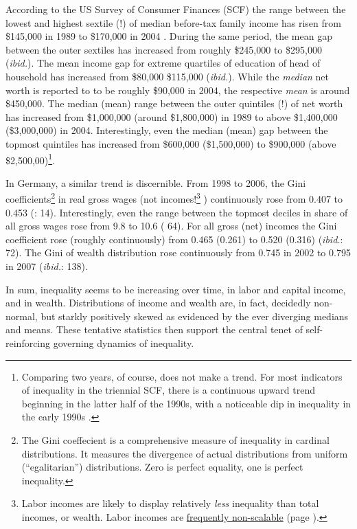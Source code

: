 According to the US Survey of Consumer Finances (SCF) the range between the lowest and highest sextile (!) of median before-tax family income has risen from \$145,000 in 1989 to \$170,000 in 2004 \citep{Bucks2006}. During the same period, the mean gap between the outer sextiles has increased from roughly \$245,000 to \$295,000 (\emph{ibid.}). The mean income gap for extreme quartiles of education of head of household has increased from \$80,000 \$115,000 (\emph{ibid.}). While the \emph{median} net worth is reported to to be roughly \$90,000 in 2004, the respective \emph{mean} is around \$450,000. The median (mean) range between the outer quintiles (!) of net worth has increased from \$1,000,000 (around \$1,800,000) in 1989 to above \$1,400,000 (\$3,000,000) in 2004. Interestingly, even the median (mean) gap between the topmost quintiles has increased from \$600,000 (\$1,500,000) to \$900,000 (above \$2,500,00)\footnote{Comparing two years, of course, does not make a trend. For most indicators of inequality in the triennial SCF, there is a continuous upward trend beginning in the latter half of the 1990s, with a noticeable dip in inequality in the early 1990s \citep{Bucks2006}.}.

In Germany, a similar trend is discernible. From 1998 to 2006, the Gini coefficients\footnote{
	The Gini coeffecient is a comprehensive measure of inequality in cardinal distributions. It measures the divergence of actual distributions from uniform (``egalitarian'') distributions. Zero is perfect equality, one is perfect inequality.}
in real gross wages (not incomes!\footnote{
	Labor incomes are likely to display relatively \emph{less} inequality than total incomes, or wealth. Labor incomes are \hyperref[sec:Extremistan]{frequently non-scalable} (page \pageref{sec:Extremistan}).}
) continuously rose from 0.407 to 0.453 (\citealt{Bundesregierung2006}: 14). Interestingly, even the range between the topmost deciles in share of all gross wages rose from 9.8 to 10.6 (\citealt{Grabka2007a} 64). For all gross (net) incomes the Gini coefficient rose (roughly continuously) from 0.465 (0.261) to 0.520 (0.316) (\emph{ibid.}: 72). The Gini of wealth distribution rose continuously from 0.745 in 2002 to 0.795 in 2007 (\emph{ibid.}: 138).

In sum, inequality seems to be increasing over time, in labor and capital income, and in wealth. Distributions of income and wealth are, in fact, decidedly non-normal, but starkly positively skewed as evidenced by the ever diverging medians and means. These tentative statistics then support the central tenet of self-reinforcing governing dynamics of inequality.

